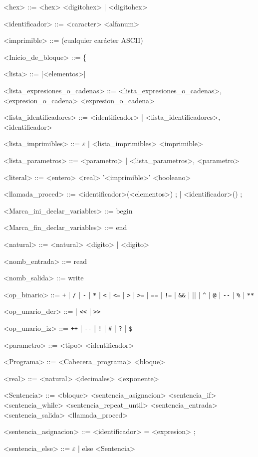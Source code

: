 \begin{grammar}
<hex> ::= <hex> <digitohex> | <digitohex>

<identificador> ::= <caracter> <alfanum>

<imprimible> ::= (cualquier carácter ASCII)

<Inicio_de_bloque> ::= \{

<lista> ::= [<elementos>]

<lista_expresiones_o_cadenas> ::= <lista_expresiones_o_cadenas>, <expresion_o_cadena>
\alt <expresion_o_cadena>

<lista_identificadores> ::= <identificador> | <lista_identificadores>, <identificador>

<lista_imprimibles> ::= $\varepsilon$ | <lista_imprimibles> <imprimible>

<lista_parametros> ::= <parametro> | <lista_parametros>, <parametro>

<literal> ::= <entero>
\alt <real>
\alt '<imprimible>'
\alt <booleano>

<llamada_proced> ::= <identificador>(<elementos>) ; | <identificador>() ;

<Marca_ini_declar_variables> ::= begin

<Marca_fin_declar_variables> ::= end

<natural> ::= <natural> <digito> | <digito>

<nomb_entrada> ::= read

<nomb_salida> ::= write

<op_binario> ::= \verb|+| | \verb|/| | \verb|-| | \verb|*| | \verb|<| | \verb|<=| | \verb|>| | \verb|>=| | \verb|==| | \verb|!=| | \verb|&&| | \verb|||| | \verb|^| | \verb|@| | \verb|--| | \verb|%| | \verb|**|

<op_unario_der> ::= | \verb|<<| | \verb|>>|

<op_unario_iz> ::= \verb|++| | \verb|--| | \verb|!| | \verb|#| | \verb|?| | \verb|$|

<parametro> ::= <tipo> <identificador>

<Programa> ::= <Cabecera_programa> <bloque>

<real> ::= <natural> <decimales> <exponente>

<Sentencia> ::= <bloque>
\alt <sentencia_asignacion>
\alt <sentencia_if>
\alt <sentencia_while>
\alt <sentencia_repeat_until>
\alt <sentencia_entrada>
\alt <sentencia_salida>
\alt <llamada_proced>

<sentencia_asignacion> ::=  <identificador> = <expresion> ;

<sentencia_else> ::= $\varepsilon$ | else <Sentencia>


\end{grammar}
